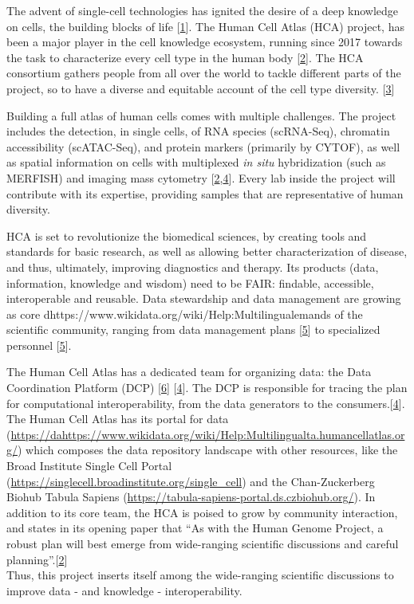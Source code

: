 The advent of single-cell technologies has ignited the desire of a deep knowledge on cells, the building blocks of life {[}\protect\hyperlink{ref-pNGap1Du}{1}{]}.
The Human Cell Atlas (HCA) project, has been a major player in the cell knowledge ecosystem, running since 2017 towards the task to characterize every cell type in the human body {[}\protect\hyperlink{ref-1GmbExweg}{2}{]}.
The HCA consortium gathers people from all over the world to tackle different parts of the project, so to have a diverse and equitable account of the cell type diversity. {[}\protect\hyperlink{ref-tjdjR2Xf}{3}{]}

Building a full atlas of human cells comes with multiple challenges. The project includes the detection, in single cells, of RNA species (scRNA-Seq), chromatin accessibility (scATAC-Seq), and protein markers (primarily by CYTOF), as well as spatial information on cells with multiplexed \emph{in situ} hybridization (such as MERFISH) and imaging mass cytometry {[}\protect\hyperlink{ref-1GmbExweg}{2},\protect\hyperlink{ref-kkwRTArg}{4}{]}. Every lab inside the project will contribute with its expertise, providing samples that are representative of human diversity.

HCA is set to revolutionize the biomedical sciences, by creating tools and standards for basic research, as well as allowing better characterization of disease, and thus, ultimately, improving diagnostics and therapy.
Its products (data, information, knowledge and wisdom) need to be FAIR: findable, accessible, interoperable and reusable.
Data stewardship and data management are growing as core dhttps://www.wikidata.org/wiki/Help:Multilingualemands of the scientific community, ranging from data management plans {[}\protect\hyperlink{ref-1DSEIjFha}{5}{]} to specialized personnel {[}\protect\hyperlink{ref-1DSEIjFha}{5}{]}.

The Human Cell Atlas has a dedicated team for organizing data: the Data Coordination Platform (DCP) {[}\protect\hyperlink{ref-zDRzmIGu}{6}{]} {[}\protect\hyperlink{ref-kkwRTArg}{4}{]}.
The DCP is responsible for tracing the plan for computational interoperability, from the data generators to the consumers.{[}\protect\hyperlink{ref-kkwRTArg}{4}{]}.
The Human Cell Atlas has its portal for data (\url{https://dahttps://www.wikidata.org/wiki/Help:Multilingualta.humancellatlas.org/}) which composes the data repository landscape with other resources, like the Broad Institute Single Cell Portal (\url{https://singlecell.broadinstitute.org/single_cell}) and the Chan-Zuckerberg Biohub Tabula Sapiens (\url{https://tabula-sapiens-portal.ds.czbiohub.org/}).
In addition to its core team, the HCA is poised to grow by community interaction, and states in its opening paper that ``As with the Human Genome Project, a robust plan will best emerge from wide-ranging scientific discussions and careful planning''.{[}\protect\hyperlink{ref-1GmbExweg}{2}{]}\\
Thus, this project inserts itself among the wide-ranging scientific discussions to improve data - and knowledge - interoperability.

